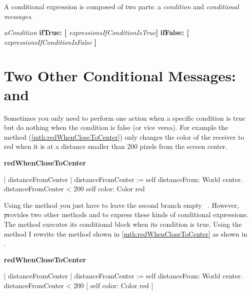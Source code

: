 A conditional expression is composed of two parts: a \textit{condition} and  \textit{conditional messages}. 

\begin{nalltt}
\textit{aCondition}
\quad  \textbf{ifTrue: [} \textit{expressionsIfConditionIsTrue}\textbf{]}
\quad  \textbf{ifFalse: [} \textit{expressionsIfConditionIsFalse} \textbf{]}
\end{nalltt}



\section{Two Other Conditional Messages:  and }

Sometimes you only need to perform one action when a specific condition is true but do nothing when the condition is false (or vice versa). For example the method  (\ref{mth:redWhenCloseToCenter}) only changes the color of the receiver to red when it is at a distance smaller than 200 pixels from the screen center. 

\begin{method}\label{mth:redWhenCloseToCenter}
\textbf{redWhenCloseToCenter}

   | distanceFromCenter | 
   distanceFromCenter := self distanceFrom: World center.
   distanceFromCenter < 200
      \bold{ifTrue: [} self color: Color red \bold{]}
\end{method}

Using the method  you just have to leave the second branch empty \ie\ \ct{[ ]}. However, \st provides two other methods  and  to express these kinds of conditional expressions. The method  executes its conditional block when its condition is true. Using the method  I rewrite the method  shown in \ref{mth:redWhenCloseToCenter} as shown in .

\begin{method}\label{mth:redWhenCloseToCenter2}
\textbf{redWhenCloseToCenter}

   | distanceFromCenter | 
   distanceFromCenter := self distanceFrom: World  center.
   distanceFromCenter < 200
       [ self color: Color red ]
\end{method}

